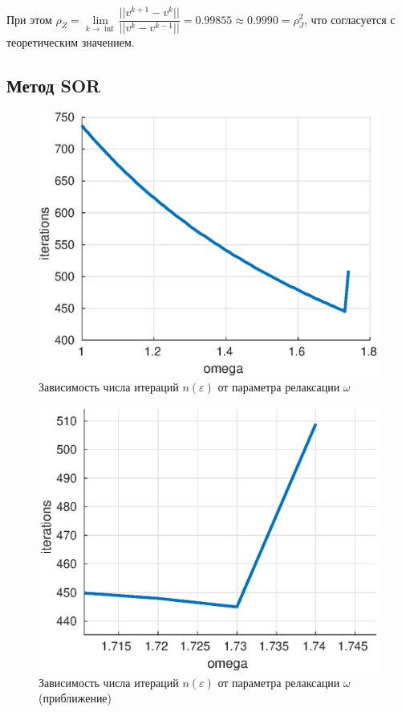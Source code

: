 \documentclass[12pt]{article}
\begin{document}
При этом $\rho_{Z} = \lim\limits_{k\rightarrow \inf}{\dfrac{||v^{k+1} - v^{k}||}{||v^{k} - v^{k-1}||}} = 0.99855 \approx 0.9990 = \rho_{J}^2$, что согласуется с теоретическим значением.

\subsection{Метод SOR}

\begin{figure}[H]
\centerline{\includegraphics[scale = 0.8]{sor.eps}}
\caption{Зависимость числа итераций $n(\varepsilon)$ от параметра релаксации $\omega$}
\end{figure} 

\begin{figure}[H]
\centerline{\includegraphics[scale = 0.8]{sor2.eps}}
\caption{Зависимость числа итераций $n(\varepsilon)$ от параметра релаксации $\omega$ (приближение)}
\end{figure} 
\end{document}
